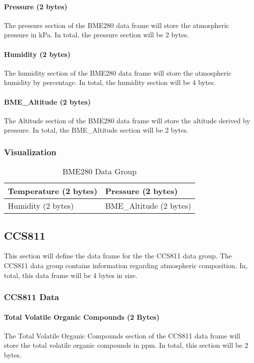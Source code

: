 \documentclass{article}
\begin{document}
  \paragraph{Pressure (2 bytes)}
  The pressure section of the BME280 data frame will store the atmospheric pressure in kPa. In total, the pressure section will be 2 bytes.
  \paragraph{Humidity (2 bytes)}
  The humidity section of the BME280 data frame will store the atmospheric humidity by percentage. In total, the humidity section will be 4 bytes.
  \paragraph{BME\_Altitude (2 bytes)}
  The Altitude section of the BME280 data frame will store the altitude derived by pressure. In total, the BME\_Altitude section will be 2 bytes.
  \subsubsection{Visualization}
  
  \begin{table}[H]
  \centering
  \caption{BME280 Data Group}
  \label{my-label}
  \begin{tabular}{|l|l|}
  \hline
Temperature (2 bytes) & Pressure (2 bytes)      \\ \hline
Humidity (2 bytes)    & BME\_Altitude (2 bytes) \\ \hline
  \end{tabular}
  \end{table}
  
  \pagebreak
  
  \subsection{CCS811}
  This section will define the data frame for the the CCS811 data group. The CCS811 data group contains information regarding atmospheric composition. In,      total, this data frame will be 4 bytes in size.
  \subsubsection{CCS811 Data}
  \paragraph{Total Volatile Organic Compounds (2 Bytes)}
  The Total Volatile Organic Compounds section of the CCS811 data frame will store the total volatile organic compounds in ppm. In total, this section will be 2 bytes.
\end{document}
